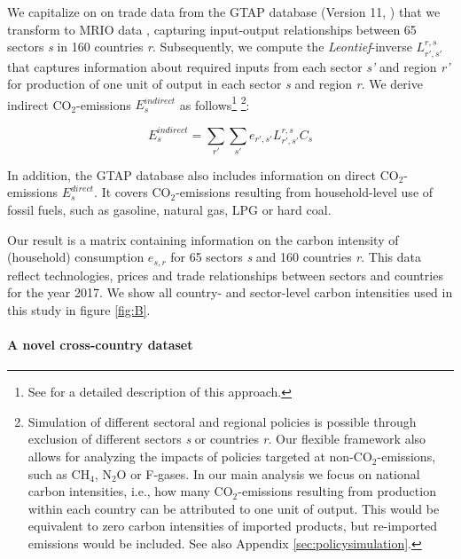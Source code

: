 \documentclass[12pt, a4paper]{article}
\begin{document}
We capitalize on on trade data from the GTAP database (Version 11,  \textcite{Aguiar.2022}) that we transform to MRIO data \autocite{Peters.2011}, capturing input-output relationships between 65 sectors \textit{s} in 160 countries \textit{r}. Subsequently, we compute the \textit{Leontief}-inverse $L_{r',s'}^{r,s}$ that captures information about required inputs from each sector \textit{s'} and region \textit{r'} for production of one unit of output in each sector \textit{s} and region \textit{r}. We derive indirect CO$_{2}$-emissions $E_{s}^{indirect}$ as follows\footnote{See \textcite{Missbach.2024, Steckel.2021b,Feindt.2021,VogtSchilb.2019} for a detailed description of this approach.} \footnote{Simulation of different sectoral and regional policies is possible through exclusion of different sectors \textit{s} or countries \textit{r}. Our flexible framework also allows for analyzing the impacts of policies targeted at non-CO$_{2}$-emissions, such as CH$_{4}$, N$_{2}$O or F-gases. In our main analysis we focus on national carbon intensities, i.e., how many CO$_{2}$-emissions resulting from production within each country can be attributed to one unit of output. This would be equivalent to zero carbon intensities of imported products, but re-imported emissions would be included. See also Appendix \ref{sec:policysimulation}.}:

\begin{equation}
    E_{s}^{indirect} = \sum_{r'} \sum_{s'} e_{r',s'} L_{r',s'}^{r,s} C_{s}
\end{equation}

In addition, the GTAP database also includes information on direct CO$_{2}$-emissions $E_{s}^{direct}$. It covers CO$_{2}$-emissions resulting from household-level use of fossil fuels, such as gasoline, natural gas, LPG or hard coal.

Our result is a matrix containing information on the carbon intensity of (household) consumption $e_{s,r}$ for 65 sectors \textit{s} and 160 countries \textit{r}. This data reflect technologies, prices and trade relationships between sectors and countries for the year 2017. We show all country- and sector-level carbon intensities used in this study in figure \ref{fig:B}.

\paragraph{A novel cross-country dataset} 
\end{document}
